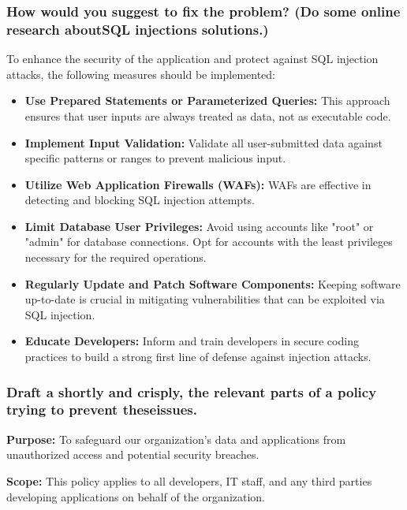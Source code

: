 \subsubsection{How would you suggest to fix the problem? (Do some online research aboutSQL injections solutions.)}
To enhance the security of the application and protect against SQL injection attacks, the following measures should be implemented:

\begin{itemize}
    \item \textbf{Use Prepared Statements or Parameterized Queries:} This approach ensures that user inputs are always treated as data, not as executable code.

    \item \textbf{Implement Input Validation:} Validate all user-submitted data against specific patterns or ranges to prevent malicious input.

    \item \textbf{Utilize Web Application Firewalls (WAFs):} WAFs are effective in detecting and blocking SQL injection attempts.

    \item \textbf{Limit Database User Privileges:} Avoid using accounts like "root" or "admin" for database connections. Opt for accounts with the least privileges necessary for the required operations.

    \item \textbf{Regularly Update and Patch Software Components:} Keeping software up-to-date is crucial in mitigating vulnerabilities that can be exploited via SQL injection.

    \item \textbf{Educate Developers:} Inform and train developers in secure coding practices to build a strong first line of defense against injection attacks.
\end{itemize}

\subsubsection{Draft a shortly and crisply, the relevant parts of a policy trying to prevent theseissues.}
\textbf{Purpose:}
To safeguard our organization's data and applications from unauthorized access and potential security breaches.

\textbf{Scope:}
This policy applies to all developers, IT staff, and any third parties developing applications on behalf of the organization.

